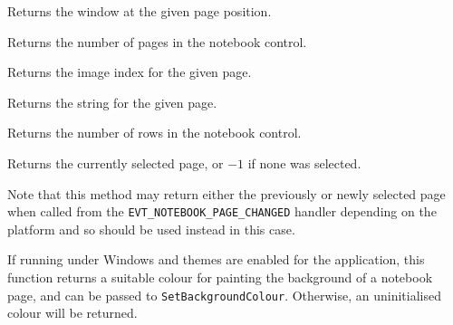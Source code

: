 Returns the window at the given page position.


\label{wxnotebookgetpagecount}


Returns the number of pages in the notebook control.


\label{wxnotebookgetpageimage}


Returns the image index for the given page.


\label{wxnotebookgetpagetext}


Returns the string for the given page.


\label{wxnotebookgetrowcount}


Returns the number of rows in the notebook control.


\label{wxnotebookgetselection}


Returns the currently selected page, or $-1$ if none was selected.

Note that this method may return either the previously or newly selected page
when called from the {\tt EVT\_NOTEBOOK\_PAGE\_CHANGED} handler depending on
the platform and so\rtfsp
{} should be
used instead in this case.

\label{wxnotebookgetthemebackgroundcolour}


If running under Windows and themes are enabled for the application, this function
returns a suitable colour for painting the background of a notebook page, and can be passed
to {\tt SetBackgroundColour}. Otherwise, an uninitialised colour will be returned.

\label{wxnotebookhittest}


